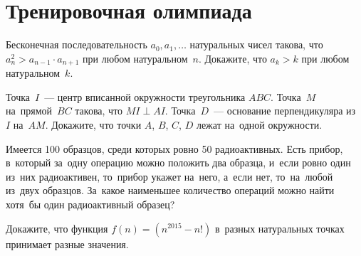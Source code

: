 
\section*{Тренировочная олимпиада}


\begin{problems}

\item
Бесконечная последовательность $a_0, a_1, \ldots$ натуральных чисел такова, что
\(
    a_{n}^2 > a_{n-1} \cdot a_{n+1}
\)
при любом натуральном~$n$.
Докажите, что $a_k > k$ при любом натуральном~$k$.

\item
Точка~$I$~— центр вписанной окружности треугольника $ABC$.
Точка~$M$ на~прямой~$BC$ такова, что $MI \perp AI$.
Точка~$D$~— основание перпендикуляра из~$I$ на~$AM$.
Докажите, что точки $A$, $B$, $C$, $D$ лежат на~одной окружности.

\item
Имеется 100 образцов, среди которых ровно 50 радиоактивных.
Есть прибор, в~который за~одну операцию можно положить два образца, и~если
ровно один из~них радиоактивен, то~прибор укажет на~него, а~если нет,
то~на~любой из~двух образцов.
За~какое наименьшее количество операций можно найти хотя~бы один радиоактивный
образец?

\item
Докажите, что функция $f(n) = (n^{2015} - n!)$ в~разных натуральных точках
принимает разные значения.

\end{problems}

